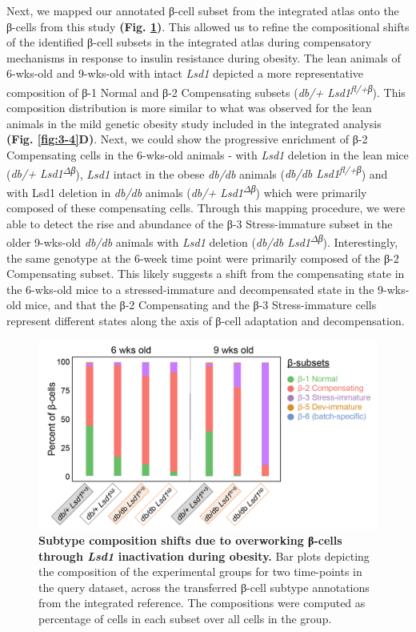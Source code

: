 Next, we mapped our annotated β-cell subset from the integrated atlas onto the β-cells from this study \textbf{(Fig. \ref{fig:chp3_valid_study_composition})}. This allowed us to refine the compositional shifts of the identified β-cell subsets in the integrated atlas during compensatory mechanisms in response to insulin resistance during obesity. The lean animals of 6-wks-old and 9-wks-old with intact \textit{Lsd1} depicted a more representative composition of β-1 Normal and β-2 Compensating subsets (\textit{db/+ Lsd1\textsuperscript{fl/+β}}). This composition distribution is more similar to what was observed for the lean animals in the mild genetic obesity study included in the integrated analysis \textbf{(Fig. \ref{fig:3-4}D)}. Next, we could show the progressive enrichment of β-2 Compensating cells in the 6-wks-old animals - with \textit{Lsd1} deletion in the lean mice (\textit{db/+ Lsd1\textsuperscript{$\Delta$β}}), \textit{Lsd1} intact in the obese \textit{db/db} animals (\textit{db/db Lsd1\textsuperscript{fl/+β}})  and with Lsd1 deletion in \textit{db/db} animals (\textit{db/+ Lsd1\textsuperscript{$\Delta$β}})  which were primarily composed of these compensating cells. Through this mapping procedure, we were able to detect the rise and abundance of the β-3 Stress-immature subset in the older 9-wks-old \textit{db/db} animals with \textit{Lsd1} deletion (\textit{db/db Lsd1\textsuperscript{$\Delta$β}}). Interestingly, the same genotype at the 6-week time point were primarily composed of the β-2 Compensating subset. This likely suggests a shift from the compensating state in the 6-wks-old mice to a stressed-immature and decompensated state in the 9-wks-old mice, and that the β-2 Compensating and the β-3 Stress-immature cells represent different states along the axis of β-cell adaptation and decompensation.\\

\begin{figure}[t]
    \centering
    \includegraphics[width=\linewidth]{Chapter5/Fig/F3-17-03.png}
    \caption[Subtype composition shifts in the query dataset]{\textbf{Subtype composition shifts due to overworking β-cells through \textit{Lsd1} inactivation during obesity.} Bar plots depicting the composition of the experimental groups for two time-points in the query dataset, across the transferred β-cell subtype annotations from the integrated reference. The compositions were computed as percentage of cells in each subset over all cells in the group.}
    \label{fig:chp3_valid_study_composition}
\end{figure}


